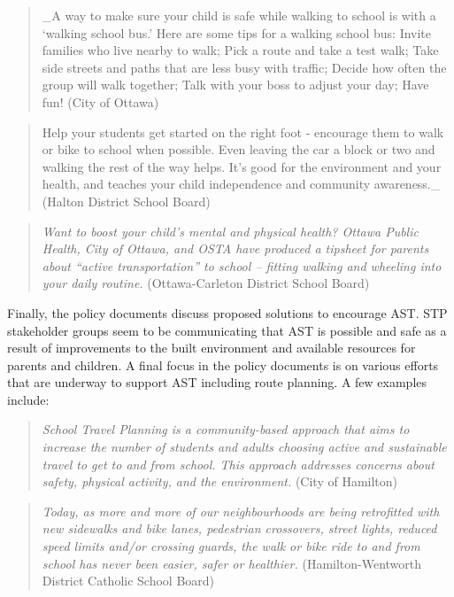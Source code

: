 \documentclass[]{elsarticle} %
\begin{document}
\begin{quote}
\_A way to make sure your child is safe while walking to school is with
a `walking school bus.' Here are some tips for a walking school bus:
Invite families who live nearby to walk; Pick a route and take a test
walk; Take side streets and paths that are less busy with traffic;
Decide how often the group will walk together; Talk with your boss to
adjust your day; Have fun! (City of Ottawa)
\end{quote}

\begin{quote}
Help your students get started on the right foot - encourage them to
walk or bike to school when possible. Even leaving the car a block or
two and walking the rest of the way helps. It's good for the environment
and your health, and teaches your child independence and community
awareness.\_ (Halton District School Board)
\end{quote}

\begin{quote}
\emph{Want to boost your child's mental and physical health? Ottawa
Public Health, City of Ottawa, and OSTA have produced a tipsheet for
parents about ``active transportation'' to school -- fitting walking and
wheeling into your daily routine.} (Ottawa-Carleton District School
Board)
\end{quote}

Finally, the policy documents discuss proposed solutions to encourage
AST. STP stakeholder groups seem to be communicating that AST is
possible and safe as a result of improvements to the built environment
and available resources for parents and children. A final focus in the
policy documents is on various efforts that are underway to support AST
including route planning. A few examples include:

\begin{quote}
\emph{School Travel Planning is a community-based approach that aims to
increase the number of students and adults choosing active and
sustainable travel to get to and from school. This approach addresses
concerns about safety, physical activity, and the environment.} (City of
Hamilton)
\end{quote}

\begin{quote}
\emph{Today, as more and more of our neighbourhoods are being
retrofitted with new sidewalks and bike lanes, pedestrian crossovers,
street lights, reduced speed limits and/or crossing guards, the walk or
bike ride to and from school has never been easier, safer or healthier.}
(Hamilton-Wentworth District Catholic School Board)
\end{quote}
\end{document}
